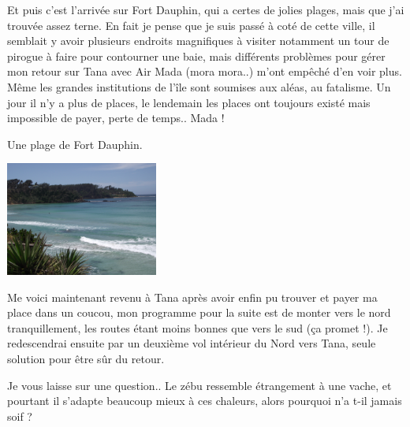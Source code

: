 \begin{multicols}{2}
Et puis c'est l'arrivée sur Fort Dauphin, qui a certes de jolies plages, mais que j'ai trouvée assez terne. En fait je pense que je suis passé à coté de cette ville, il semblait y avoir plusieurs endroits magnifiques à visiter notamment un tour de pirogue à faire pour contourner une baie, mais différents problèmes pour gérer mon retour sur Tana avec Air Mada (mora mora..) m'ont empêché d'en voir plus. Même les grandes institutions de l'île sont soumises aux aléas, au fatalisme. Un jour il n'y a plus de places, le lendemain les places ont toujours existé mais impossible de payer, perte de temps.. Mada !

Une plage de Fort Dauphin.

\smallbreak\smallbreak
\hspace*{-0.65cm}
\includegraphics[width=5cm]{articles/Chemins-du-sud/DSCF0375.JPG}
\smallbreak

Me voici maintenant revenu à Tana après avoir enfin pu trouver et payer ma place dans un coucou, mon programme pour la suite est de monter vers le nord tranquillement, les routes étant moins bonnes que vers le sud (ça promet !). Je redescendrai ensuite par un deuxième vol intérieur du Nord vers Tana, seule solution pour être sûr du retour.

Je vous laisse sur une question.. Le zébu ressemble étrangement à une vache, et pourtant il s'adapte beaucoup mieux à ces chaleurs, alors pourquoi n'a t-il jamais soif ?

\end{multicols}


